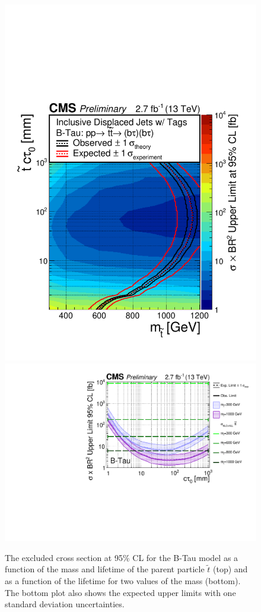 \begin{figure}[tb]
\begin{center}
\includegraphics[width=.75\textwidth]{figures/pas//RESULT/UNBLINDED_LIMITS/B-Tau2D.pdf}
\includegraphics[width=.75\textwidth]{figures/pas//RESULT/UNBLINDED_LIMITS/B-Tau.pdf}
\caption{The excluded cross section at 95\% CL for the B-Tau model as
  a function of the mass and lifetime of the parent particle
  $\tilde{t}$ (top) and as a function of the lifetime for two values
  of the mass (bottom).  The bottom plot also shows the expected upper
  limits with one standard deviation
  uncertainties.\label{fig:dsusy_limit_tau}}
\end{center}
\end{figure}

